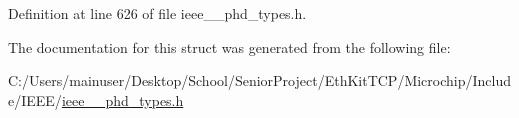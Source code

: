 Definition at line 626 of file ieee\+\_\+\_\+phd\+\_\+types.\+h.



The documentation for this struct was generated from the following file\+:\begin{DoxyCompactItemize}
\item 
C\+:/\+Users/mainuser/\+Desktop/\+School/\+Senior\+Project/\+Eth\+Kit\+T\+C\+P/\+Microchip/\+Include/\+I\+E\+E\+E/\hyperlink{ieee__11073__phd__types_8h}{ieee\+\_\+\_\+phd\+\_\+types.\+h}\end{DoxyCompactItemize}
